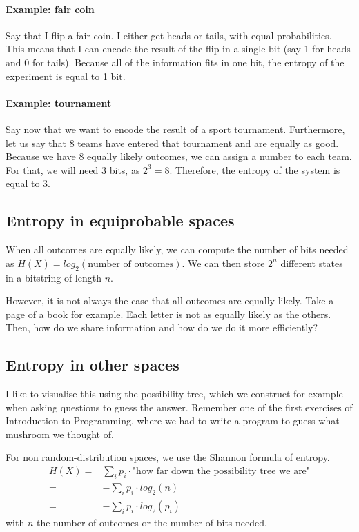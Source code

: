 \documentclass[10pt,a4paper]{book}
\begin{document}
\paragraph{Example: fair coin}
Say that I flip a fair coin. I either get heads or tails, with equal probabilities. This means that I can encode the result of the flip in a single bit (say 1 for heads and 0 for tails). Because all of the information fits in one bit, the entropy of the experiment is equal to 1 bit.
\paragraph{Example: tournament}
Say now that we want to encode the result of a sport tournament. Furthermore, let us say that 8 teams have entered that tournament and are equally as good. Because we have 8 equally likely outcomes, we can assign a number to each team. For that, we will need 3 bits, as $2^3=8$. Therefore, the entropy of the system is equal to 3.

\subsection{Entropy in equiprobable spaces}
When all outcomes are equally likely, we can compute the number of bits needed as $H(X)=log_2(\text{number of outcomes})$. We can then store $2^n$ different states in a bitstring of length $n$.\par
However, it is not always the case that all outcomes are equally likely. Take a page of a book for example. Each letter is not as equally likely as the others. Then, how do we share information and how do we do it more efficiently?\par 

\subsection{Entropy in other spaces}
I like to visualise this using the possibility tree, which we construct for example when asking questions to guess the answer. Remember one of the first exercises of Introduction to Programming, where we had to write a program to guess what mushroom we thought of.\par
For non random-distribution spaces, we use the Shannon formula of entropy.
\begin{align*}
H(X)=& \sum_{i} p_i\cdot \text{"how far down the possibility tree we are"}\\
	=& -\sum_{i} p_i\cdot log_2(n) \\
	=& -\sum_{i} p_i\cdot log_2(p_i) 
\end{align*}
with $n$ the number of outcomes or the number of bits needed.
\end{document}
